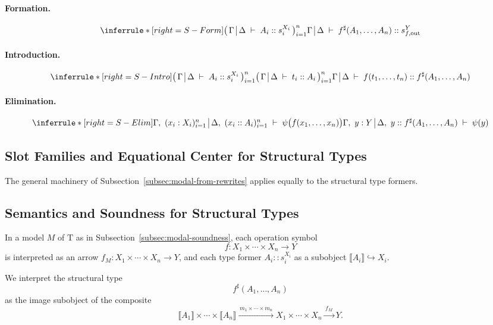 \documentclass[11pt]{article}
\makeatletter
\theoremstyle{definition}
\theoremstyle{plain}
\theoremstyle{remark}
\theoremstyle{plain}
\newcommand{\judg}[3]{%
  \begingroup
    \setlength{\arraycolsep}{0.3ex}%
    \ensuremath{%
      \begin{array}[t]{@{}l@{\;}|@{\;}l@{}}%
        #1 & #2%
      \end{array}%
      \;\vdash\; #3%
    }%
  \endgroup
}
\newcommand{\sem}[1]{\llbracket #1 \rrbracket}
\newcommand{\mrm}[1]{\mathrm{#1}}
\newcommand{\T}{\mrm{T}}
\makeatother
\begin{document}
\paragraph{Formation.}
\[
\inferrule*[right={S-Form}]
  {
    \bigl(\,\judg{\Gamma}{\Delta}{A_i :: s_i^{X_i}}\,\bigr)_{i=1}^n
  }
  {
    \judg{\Gamma}{\Delta}{f^{\sharp}(A_1,\dots,A_n) :: s_{f,\mrm{out}}^{Y}}
  }
\]

\paragraph{Introduction.}
\[
\inferrule*[right={S-Intro}]
  {
    \bigl(\,\judg{\Gamma}{\Delta}{A_i :: s_i^{X_i}}\,\bigr)_{i=1}^n
    \\
    \bigl(\,\judg{\Gamma}{\Delta}{t_i :: A_i}\,\bigr)_{i=1}^n
  }
  {
    \judg{\Gamma}{\Delta}{f(t_1,\dots,t_n) :: f^{\sharp}(A_1,\dots,A_n)}
  }
\]

\paragraph{Elimination.}
\[
\inferrule*[right={S-Elim}]
  {
    \judg{\Gamma,\ (x_i:X_i)_{i=1}^n}{\Delta,\ (x_i::A_i)_{i=1}^n}{\psi\bigl(f(x_1,\dots,x_n)\bigr)}
  }
  {
    \judg{\Gamma,\ y:Y}{\Delta,\ y::f^{\sharp}(A_1,\dots,A_n)}{\psi(y)}
  }
\]

\subsection{Slot Families and Equational Center for Structural Types}

The general machinery of Subsection~\ref{subsec:modal-from-rewrites} applies equally to the structural type formers.

\subsection{Semantics and Soundness for Structural Types}

In a model $M$ of $\T$ as in Subsection~\ref{subsec:modal-soundness}, each operation symbol
\[
  f : X_1\times\cdots\times X_n \to Y
\]
is interpreted as an arrow $f_M : X_1\times\cdots\times X_n\to Y$, and each type former $A_i::s_i^{X_i}$ as a subobject $\sem{A_i}\hookrightarrow X_i$.

We interpret the structural type
\[
  f^{\sharp}(A_1,\dots,A_n)
\]
as the image subobject of the composite
\[
  \sem{A_1}\times\cdots\times\sem{A_n}
    \xrightarrow{\,m_1\times\cdots\times m_n\,}
  X_1\times\cdots\times X_n
    \xrightarrow{\,f_M\,}
  Y.
\]
\end{document}

